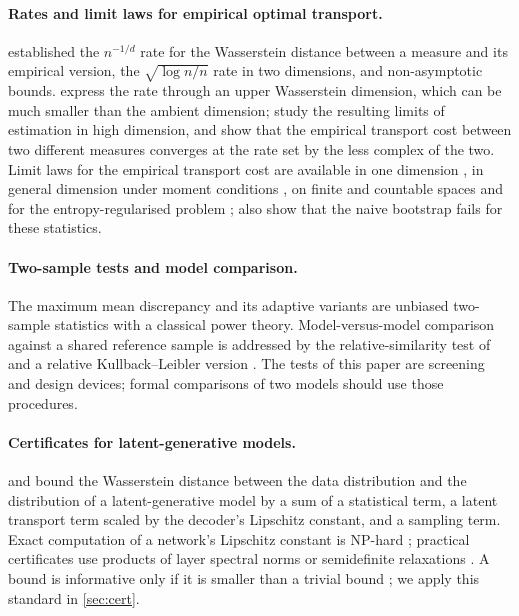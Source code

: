 \documentclass[twoside,11pt]{article}
\theoremstyle{plain}
\theoremstyle{definition}
\theoremstyle{remark}
\begin{document}
\paragraph{Rates and limit laws for empirical optimal transport.}
\citet{dudley1969} established the $n^{-1/d}$ rate for the Wasserstein
distance between a measure and its empirical version, \citet{ajtai1984}
the $\sqrt{\log n/n}$ rate in two dimensions, and \citet{fournier2015}
non-asymptotic bounds. \citet{weedbach2019} express the rate through an
upper Wasserstein dimension, which can be much smaller than the ambient
dimension; \citet{nilesweed2022} study the resulting limits of estimation in high
dimension, and \citet{hundrieser2024} show that the empirical transport
cost between two different measures converges at the rate set by the less
complex of the two. Limit laws for the empirical
transport cost are available in one dimension \citep{delbario1999}, in
general dimension under moment conditions \citep{delbarioloubes2019}, on
finite and countable spaces \citep{sommerfeld2018,tameling2019} and for the
entropy-regularised problem \citep{bigot2019}; \citet{sommerfeld2018} also
show that the naive bootstrap fails for these statistics.

\paragraph{Two-sample tests and model comparison.}
The maximum mean discrepancy \citep{gretton2007,gretton2012} and its
adaptive variants
\citep{schrab2023} are unbiased two-sample statistics with a classical power
theory. Model-versus-model comparison against a shared reference sample is
addressed by the relative-similarity test of \citet{bounliphone2016} and a
relative Kullback--Leibler version \citep{gao2025}. The tests of this paper
are screening and design devices; formal comparisons of two models should
use those procedures.

\paragraph{Certificates for latent-generative models.}
\citet{dao2023} and \citet{lee2025} bound the Wasserstein distance between
the data distribution and the distribution of a latent-generative model by
a sum of a statistical term, a latent transport term scaled by the
decoder's Lipschitz constant, and a sampling term. Exact computation of a network's Lipschitz constant is NP-hard
\citep{virmaux2018}; practical certificates use products of layer spectral
norms \citep{szegedy2014} or semidefinite relaxations \citep{fazlyab2019}. A bound is informative only if it is
smaller than a trivial bound \citep{dziugaite2017}; we apply this standard
in \cref{sec:cert}.
\end{document}
